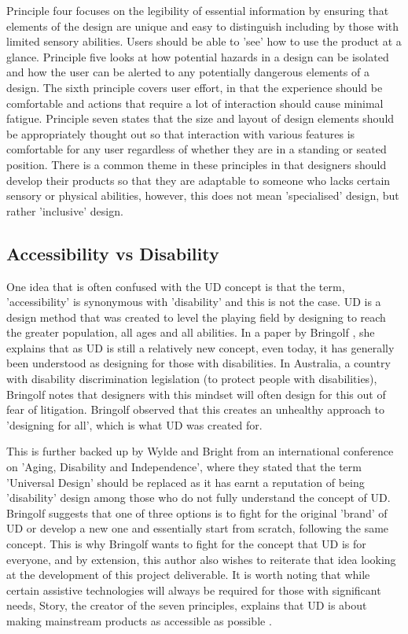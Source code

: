 Principle four focuses on the legibility of essential information by ensuring that elements of the design are unique and easy to distinguish including by those with limited sensory abilities.
Users should be able to 'see' how to use the product at a glance.
Principle five looks at how potential hazards in a design can be isolated and how the user can be alerted to any potentially dangerous elements of a design.
The sixth principle covers user effort, in that the experience should be comfortable and actions that require a lot of interaction should cause minimal fatigue.
Principle seven states that the size and layout of design elements should be appropriately thought out so that interaction with various features is comfortable for any user regardless of whether they are in a standing or seated position.
There is a common theme in these principles in that designers should develop their products so that they are adaptable to someone who lacks certain sensory or physical abilities, however, this does not mean 'specialised' design, but rather 'inclusive' design.

\subsection{Accessibility vs Disability}

One idea that is often confused with the UD concept is that the term, 'accessibility' is synonymous with 'disability' and this is not the case.
UD is a design method that was created to level the playing field by designing to reach the greater population, all ages and all abilities.
In a paper by Bringolf \cite{accessible}, she explains that as UD is still a relatively new concept, even today, it has generally been understood as designing for those with disabilities.
In Australia, a country with disability discrimination legislation (to protect people with disabilities), Bringolf notes that designers with this mindset will often design for this out of fear of litigation.
Bringolf observed that this creates an unhealthy approach to 'designing for all', which is what UD was created for. %

This is further backed up by Wylde \cite{accessiblebackup1} and Bright \cite{accessiblebackup2} from an international conference on 'Aging, Disability and Independence', where they stated that the term 'Universal Design' should be replaced as it has earnt a reputation of being 'disability' design among those who do not fully understand the concept of UD.
Bringolf suggests that one of three options is to fight for the original 'brand' of UD or develop a new one and essentially start from scratch, following the same concept.
This is why Bringolf wants to fight for the concept that UD is for everyone, and by extension, this author also wishes to reiterate that idea looking at the development of this project deliverable. %
It is worth noting that while certain assistive technologies will always be required for those with significant needs, Story, the creator of the seven principles, explains that UD is about making mainstream products as accessible as possible \cite{sevenprinciples}.


